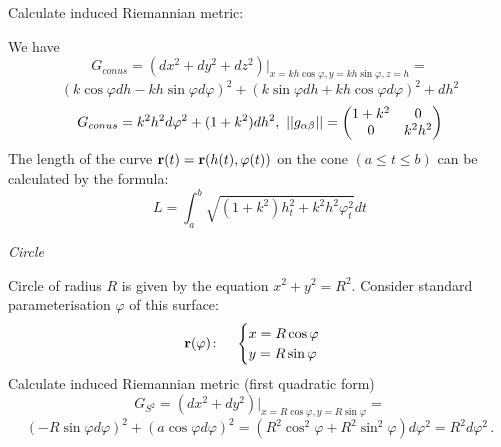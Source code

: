 \documentclass[12pt]{article}
\theoremstyle{theorem}
\numberwithin{equation}{section}
\begin{document}
\medskip

   Calculate induced Riemannian metric:

We have               $$
             G_{conus}=\left(dx^2+dy^2+dz^2\right)
\big\vert_{x=kh\cos\varphi,y=kh\sin\varphi,z=h}=
                      $$
                      $$
                      (k\cos\varphi dh-kh\sin\varphi d\varphi)^2+
             (k\sin\varphi dh+kh\cos\varphi d\varphi)^2+dh^2
                      $$
        \begin{equation}\label{firstquadraticformforconus}
            G_{conus} =k^2h^2d\varphi^2+(1+k^2)dh^2,\,\,
                        ||g_{\alpha\beta}||=
   \begin{pmatrix}
   1+k^2 & 0 \\
   0&  k^2h^2 \\
   \end{pmatrix}
                       \end{equation}
The length of the curve ${\bf r}(t)={\bf r} (h(t), \varphi(t))$ on the
  cone
    $(a\leq t\leq b)$
  can be calculated by the formula:
               \begin{equation}
             L=\int_a^b
             \sqrt{(1+k^2)h_t^2+k^2h^2\varphi_t^2}dt
               \end{equation}

\medskip
 \centerline {\it Circle}
  Circle of radius $R$ is given by the equation $x^2+y^2=R^2$. Consider standard parameterisation
  $\varphi$
 of this surface:
\begin{equation*}\label{surfacecircle}
  {\bf r}(\varphi)\colon\quad
  \begin{cases}
  x=R\cos\varphi\\
  y=R\sin\varphi\\
  \end{cases}
\end{equation*}
   Calculate induced Riemannian metric (first quadratic form)
              $$
              G_{S^2}=\left(dx^2+dy^2\right)\big\vert_{x=R\cos\varphi,y=R\sin\varphi}=
                      $$
                      $$
                      (-R\sin\varphi d\varphi)^2+
                      (a\cos\varphi d\varphi)^2=
          (R^2\cos^2\varphi+R^2\sin^2\varphi)d\varphi^2=
             R^2 d\varphi^2\,.
             $$
\end{document}

